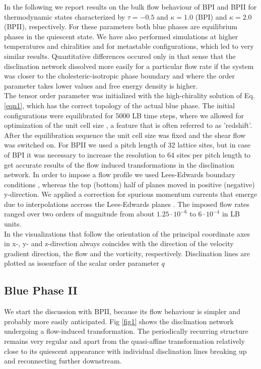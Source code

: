 \documentclass[aps,pre,twocolumn,groupedaddress]{revtex4-1}
\begin{document}
In the following we report results on the bulk flow behaviour of BPI and BPII for thermodynamic states characterized by $\tau=-0.5$ and $\kappa=1.0$ (BPI) and $\kappa=2.0$ (BPII), respectively.
For these parameters both blue phases are equilibrium phases in the quiescent state.
We have also performed simulations at higher temperatures and chiralities and for metastable configurations, which led to very similar results.
Quantitative differences occured only in that sense that the disclination network dissolved more easily for a particular flow rate if the system was closer to the cholesteric-isotropic phase boundary and where the order parameter takes lower values and free energy density is higher.\\
The tensor order parameter was initialized with the high-chirality solution of Eq. \ref{eqn1}, which has the correct topology of the actual blue phase.
The initial configurations were equilibrated for $5000$ LB time steps, where we allowed for optimization of the unit cell size \cite{Alexander:2006}, a feature that is often referred to as 'redshift'.
After the equilibration sequence the unit cell size was fixed and the shear flow was switched on.
For BPII we used a pitch length of 32 lattice sites, but in case of BPI it was necessary to increase the resolution to 64 sites per pitch length to get accurate results of the flow induced transformations in the disclination network.
In order to impose a flow profile we used Lees-Edwards boundary conditions \cite{Wagner:2002}, whereas the top (bottom) half of planes moved in positive (negative) y-direction.
We applied a correction for spurious momentum currents that emerge due to interpolations accross the Lees-Edwards planes \cite{Henrich:2011b}.
The imposed flow rates ranged over two orders of magnitude from about $1.25\cdot 10^{-6}$ to $6\cdot10^{-4}$ in LB units.\\
In the visualizations that follow the orientation of the principal coordinate axes in x-, y- and z-direction always coincides with the direction of the velocity gradient direction, the flow and the vorticity, respectively.
Disclination lines are plotted as isosurface of the scalar order parameter $q$

\subsection{Blue Phase II}

We start the discussion with BPII, because its flow behaviour is simpler and probably more easily anticipated.
Fig \ref{fig1} shows the disclination network undergoing a flow-induced transformation.
The periodically recurring structure remains very regular and apart from the quasi-affine transformation relatively close to its quiescent appearance with individual disclination lines breaking up and reconnecting further downstream.
\end{document}
